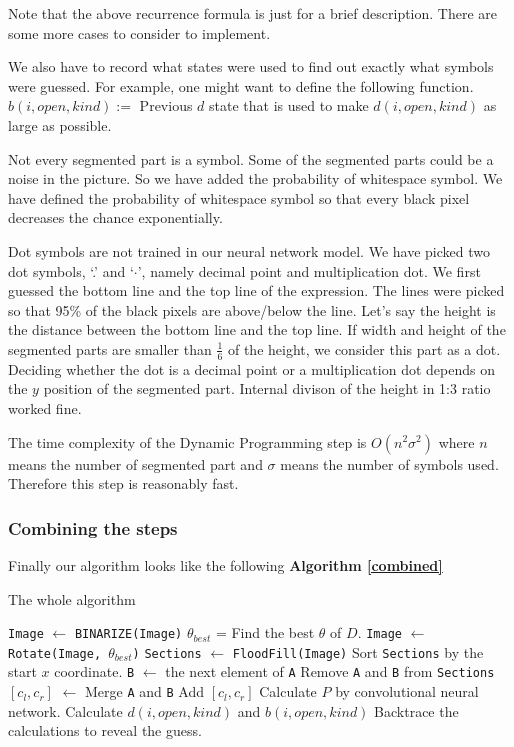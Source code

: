 \documentclass[10pt,twocolumn,letterpaper]{article}
\begin{document}
Note that the above recurrence formula is just for a brief description.
There are some more cases to consider to implement.

We also have to record what states were used to find out exactly what symbols were guessed.
For example, one might want to define the following function.
$b(i, open, kind) := $ Previous $d$ state that is used to make $d(i, open, kind)$
as large as possible.

Not every segmented part is a symbol. Some of the segmented parts could be a noise in the picture.
So we have added the probability of whitespace symbol.
We have defined the probability of whitespace symbol so that every black pixel decreases the chance exponentially.

Dot symbols are not trained in our neural network model.
We have picked two dot symbols, `.' and `$\cdot$',
namely decimal point and multiplication dot.
We first guessed the bottom line and the top line of the expression.
The lines were picked so that 95\% of the black pixels are above/below the line.
Let's say the height is the distance between the bottom line and the top line.
If width and height of the segmented parts are smaller than $\frac{1}{6}$ of the height,
we consider this part as a dot.
Deciding whether the dot is a decimal point or a multiplication dot depends on the $y$ position of the segmented part.
Internal divison of the height in 1:3 ratio worked fine.

The time complexity of the Dynamic Programming step is $O(n^2 \sigma^2)$ where $n$ means the number of segmented part and
$\sigma$ means the number of symbols used. Therefore this step is reasonably fast.


\subsubsection{Combining the steps}


Finally our algorithm looks like the following \textbf{Algorithm  \ref{combined}}
\begin{algorithm}
\caption{The whole algorithm}
\label{combined}
\begin{algorithmic}[1]
\State \texttt{Image} $\gets$ \texttt{BINARIZE(Image)}
\State $\theta_{best}$ = Find the best $\theta$ of $D$.
\State \texttt{Image} $\gets$ \texttt{Rotate(Image, $\theta_{best}$)}
\State \texttt{Sections} $\gets$ \texttt{FloodFill(Image)}
\State Sort \texttt{Sections} by the start $x$ coordinate.
    \State \texttt{B} $\gets$ the next element of \texttt{A}
        \State Remove \texttt{A} and \texttt{B} from \texttt{Sections}
        \State $[c_{l}, c_{r}]$ $\gets$ Merge \texttt{A} and \texttt{B}
        \State Add $[c_{l}, c_{r}]$
    \EndIf
\EndFor
{}
    \State Calculate $P$ by convolutional neural network.
\EndFor
\State Calculate $d(i, open, kind)$ and $b(i, open, kind)$
\State Backtrace the calculations to reveal the guess.
\end{algorithmic}
\end{algorithm}
\end{document}
